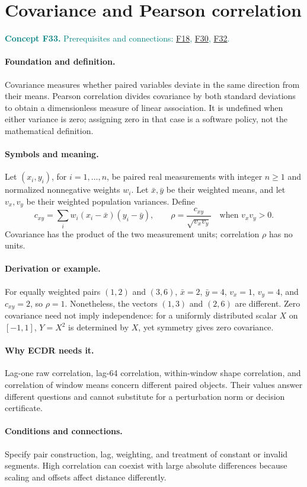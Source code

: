 \documentclass[11pt,a4paper]{article}
\newcommand{\conceptid}{Front matter}
\newcommand{\concept}[3]{\clearpage\renewcommand{\conceptid}{#1}%
\section{#2}\label{concept:#1}%
\textcolor{teal}{\textbf{Concept #1.} Prerequisites and connections: #3.}\par
\typeout{ECDR-CONCEPT-START #1 PAGE=\thepage}}
\begin{document}
\concept{F33}{Covariance and Pearson correlation}{\hyperref[concept:F18]{F18}, \hyperref[concept:F30]{F30}, \hyperref[concept:F32]{F32}}
\paragraph{Foundation and definition.}
Covariance measures whether paired variables deviate in the same
direction from their means. Pearson correlation divides covariance by
both standard deviations to obtain a dimensionless measure of linear
association. It is undefined when either variance is zero; assigning
zero in that case is a software policy, not the mathematical definition.
\paragraph{Symbols and meaning.}
Let $(x_i,y_i)$, for $i=1,\ldots,n$, be paired real measurements with
integer $n\ge1$ and normalized nonnegative weights $w_i$. Let
$\bar x,\bar y$ be their weighted means, and let $v_x,v_y$ be their
weighted population variances. Define
\[
 c_{xy}=\sum_i w_i(x_i-\bar x)(y_i-\bar y),
 \qquad \rho=\frac{c_{xy}}{\sqrt{v_xv_y}}
 \quad\text{when }v_xv_y>0.
\]
Covariance has the product of the two measurement units; correlation
$\rho$ has no units.
\paragraph{Derivation or example.}
For equally weighted pairs $(1,2)$ and $(3,6)$,
$\bar x=2$, $\bar y=4$, $v_x=1$, $v_y=4$, and $c_{xy}=2$,
so $\rho=1$. Nonetheless, the vectors $(1,3)$ and $(2,6)$ are
different. Zero covariance need not imply independence: for a uniformly
distributed scalar $X$ on $[-1,1]$, $Y=X^2$ is determined by $X$,
yet symmetry gives zero covariance.
\paragraph{Why ECDR needs it.}
Lag-one raw correlation, lag-64 correlation, within-window shape
correlation, and correlation of window means concern different paired
objects. Their values answer different questions and cannot substitute
for a perturbation norm or decision certificate.
\paragraph{Conditions and connections.}
Specify pair construction, lag, weighting, and treatment of constant or
invalid segments. High correlation can coexist with large absolute
differences because scaling and offsets affect distance differently.
\par\label{endconcept:F33}
\end{document}

